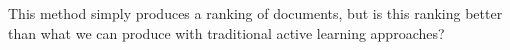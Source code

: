 \documentclass[9pt,aspectratio=169]{beamer}
\begin{document}
\begin{frame}{This method simply produces a ranking of documents, but is this ranking better than what we can produce with traditional active learning approaches?}
	
	\begin{columns}
		\begin{column}{0.618\linewidth}
			\begin{figure}
				

\end{figure}
\end{column}
\end{columns}
\end{frame}
\end{document}
